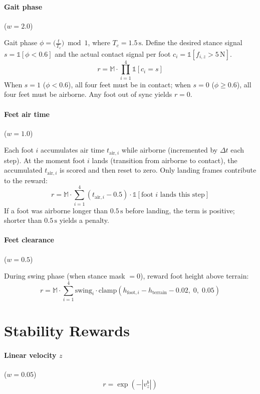 \documentclass[11pt, a4paper]{article}
\begin{document}
\paragraph{Gait phase} ($w = 2.0$)

Gait phase $\phi = \bigl(\frac{t}{T_c}\bigr) \bmod 1$, where $T_c = 1.5\,\text{s}$.
Define the desired stance signal $s = \mathbb{1}[\phi < 0.6]$
and the actual contact signal per foot $c_i = \mathbb{1}[f_{i,z} > 5\,\text{N}]$.
\[
  r = \mathbb{M} \cdot \prod_{i=1}^{4} \mathbb{1}[c_i = s]
\]
When $s=1$ ($\phi < 0.6$), all four feet must be in contact;
when $s=0$ ($\phi \geq 0.6$), all four feet must be airborne.
Any foot out of sync yields $r = 0$.

\paragraph{Feet air time} ($w = 1.0$)

Each foot $i$ accumulates air time $t_{\text{air},i}$ while airborne (incremented by $\Delta t$ each step).
At the moment foot $i$ lands (transition from airborne to contact), the accumulated
$t_{\text{air},i}$ is scored and then reset to zero. Only landing frames contribute to the reward:
\[
  r = \mathbb{M} \cdot \sum_{i=1}^{4} (t_{\text{air},i} - 0.5)\cdot \mathbb{1}[\text{foot } i \text{ lands this step}]
\]
If a foot was airborne longer than $0.5\,\text{s}$ before landing, the term is positive;
shorter than $0.5\,\text{s}$ yields a penalty.

\paragraph{Feet clearance} ($w = 0.5$)

During swing phase (when stance mask $= 0$), reward foot height above terrain:
\[
  r = \mathbb{M} \cdot \sum_{i=1}^{4} \text{swing}_i \cdot \text{clamp}(h_{\text{foot},i} - h_{\text{terrain}} - 0.02,\; 0,\; 0.05)
\]

\section{Stability Rewards}

\paragraph{Linear velocity $z$} ($w = 0.05$)
\[
  r = \exp(-|v^b_z|)
\]
\end{document}
